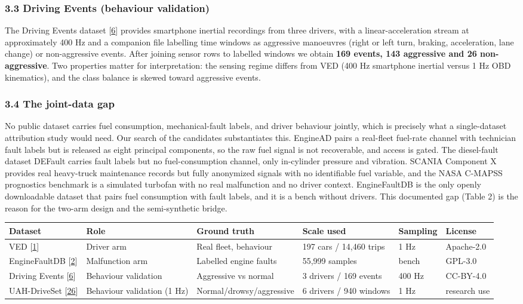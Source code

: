 \subsubsection{3.3 Driving Events (behaviour
validation)}\label{driving-events-behaviour-validation}

The Driving Events dataset {[}\hyperref[r6]{6}{]} provides smartphone
inertial recordings from three drivers, with a linear-acceleration
stream at approximately 400 Hz and a companion file labelling time
windows as aggressive manoeuvres (right or left turn, braking,
acceleration, lane change) or non-aggressive events. After joining
sensor rows to labelled windows we obtain \textbf{169 events, 143
aggressive and 26 non-aggressive}. Two properties matter for
interpretation: the sensing regime differs from VED (400 Hz smartphone
inertial versus 1 Hz OBD kinematics), and the class balance is skewed
toward aggressive events.

\subsubsection{3.4 The joint-data gap}\label{the-joint-data-gap}

No public dataset carries fuel consumption, mechanical-fault labels, and
driver behaviour jointly, which is precisely what a single-dataset
attribution study would need. Our search of the candidates substantiates
this. EngineAD pairs a real-fleet fuel-rate channel with technician
fault labels but is released as eight principal components, so the raw
fuel signal is not recoverable, and access is gated. The diesel-fault
dataset DEFault carries fault labels but no fuel-consumption channel,
only in-cylinder pressure and vibration. SCANIA Component X provides
real heavy-truck maintenance records but fully anonymized signals with
no identifiable fuel variable, and the NASA C-MAPSS prognostics
benchmark is a simulated turbofan with no real malfunction and no driver
context. EngineFaultDB is the only openly downloadable dataset that
pairs fuel consumption with fault labels, and it is a bench without
drivers. This documented gap (Table 2) is the reason for the two-arm
design and the semi-synthetic bridge.

\begin{longtable}[]{@{}llllll@{}}
\toprule\noalign{}
Dataset & Role & Ground truth & Scale used & Sampling & License \\
\midrule\noalign{}
\endhead
\bottomrule\noalign{}
\endlastfoot
VED {[}\hyperref[r1]{1}{]} & Driver arm & Real fleet, behaviour & 197
cars / 14,460 trips & 1 Hz & Apache-2.0 \\
EngineFaultDB {[}\hyperref[r2]{2}{]} & Malfunction arm & Labelled engine
faults & 55,999 samples & bench & GPL-3.0 \\
Driving Events {[}\hyperref[r6]{6}{]} & Behaviour validation &
Aggressive vs normal & 3 drivers / 169 events & 400 Hz & CC-BY-4.0 \\
UAH-DriveSet {[}\hyperref[r26]{26}{]} & Behaviour validation (1 Hz) &
Normal/drowsy/aggressive & 6 drivers / 940 windows & 1 Hz & research
use \\
\end{longtable}

